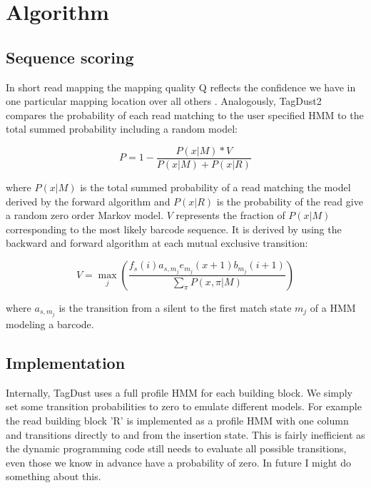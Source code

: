\documentclass[11pt,a4paper,oneside]{book}
\begin{document}
\chapter{Algorithm}

\section{Sequence scoring} 

In short read mapping the mapping quality Q reflects the confidence we have in one particular mapping location over all others \cite{li2008mapping}. Analogously, TagDust2 compares the probability of each read matching to the user specified HMM to the total summed probability including a random model:

\begin{equation}
P = 1 - \frac{P(x|M)*V}{P(x|M) + P(x|R)}
\end{equation} 

where $P(x|M)$ is the total summed probability of a read matching the model derived by the forward algorithm and $P(x|R)$ is the probability of the read give a random zero order Markov model. $V$ represents the fraction of $P(x|M)$ corresponding to the most likely barcode sequence. It is derived by using the backward and forward algorithm at each mutual exclusive transition:

\begin{equation}
	V = \max_j \left( \frac{f_s(i)   a_{s,m_j} e_{m_j}(x+1) b_{m_j}(i+1)}{\sum\limits_{\pi} P(x,\pi | M )}\right)
\end{equation}

where $ a_{s,m_j}$ is the transition from a silent to the first match state $m_j$ of a HMM modeling a barcode.  
 


\section{Implementation} 

Internally, TagDust uses a full profile HMM for each building block. We simply set some transition probabilities to zero to emulate different models. For example the read building block 'R' is implemented as a profile HMM with one column and transitions directly to and from the insertion state.
This is fairly inefficient as the dynamic programming code still needs to evaluate all possible transitions, even those we know in advance have a probability of zero. In future I might do something about this. 
\end{document}
